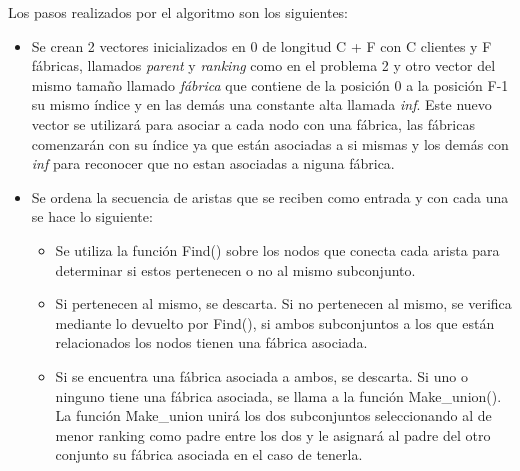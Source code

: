 \documentclass[a4paper, 10pt, twoside]{article}
\begin{document}
Los pasos realizados por el algoritmo son los siguientes:

\begin{itemize}
	\item Se crean 2 vectores inicializados en 0 de longitud C + F con C clientes y F fábricas, llamados \textit{parent} y \textit{ranking} como en el problema 2 y otro vector del mismo tamaño llamado \textit{fábrica} que contiene de la posición 0 a la posición F-1  
su mismo índice y en las demás una constante alta llamada \textit{inf}. Este nuevo vector se utilizará para asociar a cada nodo con una fábrica, las fábricas comenzarán con su índice ya que están asociadas a si mismas y los demás con \textit{inf} para reconocer que no estan asociadas a niguna fábrica.

	\item Se ordena la secuencia de aristas que se reciben como entrada y con cada una se hace lo siguiente:
	\begin{itemize}
		\item Se utiliza la función Find() sobre los nodos que conecta cada arista para determinar si estos pertenecen o no al mismo subconjunto.
		\item Si pertenecen al mismo, se descarta. Si no pertenecen al mismo, se verifica  mediante lo devuelto por Find(), si ambos subconjuntos a los que están relacionados los nodos tienen una fábrica asociada.
		\item Si se encuentra una fábrica asociada a ambos, se descarta. Si uno o ninguno tiene una fábrica asociada, se llama a la función Make\_union(). La función Make\_union unirá los dos subconjuntos seleccionando al de menor ranking como padre entre los dos y le asignará al padre del otro conjunto su fábrica asociada en el caso de tenerla.
	\end{itemize}
\end{itemize}
\end{document}
